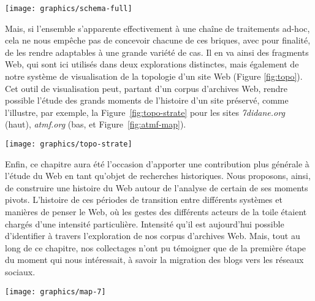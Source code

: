 \documentclass[symmetric,justified,marginals=raggedouter]{tufte-book}
\begin{document}
\begin{figure*}[hbtp]%
  \texttt{[image: graphics/schema-full]}
  \caption{Résumé des diverses opérations mises en place lors des explorations \protect\ref{sec:6_blogs} et \protect\ref{sec:6_printemps}, avec distinction entre approches automatiques et manuelles}
  \label{fig:schema-full}
\end{figure*}

Mais, si l'ensemble s'apparente effectivement à une chaîne de traitements ad-hoc, cela ne nous empêche pas de concevoir chacune de ces briques, avec pour finalité, de les rendre adaptables à une grande variété de cas. Il en va ainsi des fragments Web, qui sont ici utilisés dans deux explorations distinctes, mais également de notre système de visualisation de la topologie d'un site Web (Figure \ref{fig:topo}). Cet outil de visualisation peut, partant d'un corpus d'archives Web, rendre possible l'étude des grands moments de l'histoire d'un site préservé, comme l'illustre, par exemple, la Figure~\ref{fig:topo-strate} pour les sites \textit{7didane.org} (haut), \textit{atmf.org} (bas, et Figure~\ref{fig:atmf-map}).

\begin{figure*}%
  \texttt{[image: graphics/topo-strate]}
  \caption{vue de l'évolution de la structure des sites \textit{7didane.org} (haut), \textit{atmf.org} (bas)}
  \label{fig:topo-strate}
\end{figure*}

\noindent Enfin, ce chapitre aura été l'occasion d'apporter une contribution plus générale à l'étude du Web en tant qu'objet de recherches historiques. Nous proposons, ainsi, de construire une histoire du Web autour de l'analyse de certain de ses moments pivots. L'histoire de ces périodes de transition entre différents systèmes et manières de penser le Web, où les gestes des différents acteurs de la toile étaient chargés d'une intensité particulière. Intensité qu'il est aujourd'hui possible d'identifier à travers l'exploration de nos corpus d'archives Web. Mais, tout au long de ce chapitre, nos collectages n'ont pu témoigner que de la première étape du moment qui nous intéressait, à savoir la migration des blogs vers les réseaux sociaux.

\begin{marginfigure}%
  \texttt{[image: graphics/map-7]}
  \vspace*{0.2cm}  
  \caption{\textit{atmf.org} (rouge) dans l'e-Diaspora marocaine}
  \label{fig:atmf-map}
\end{marginfigure} 
\end{document}
